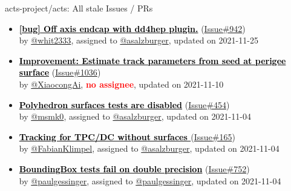 \begin{frame}[allowframebreaks]{ acts-project/acts: All stale Issues / PRs}
\begin{itemize}
    \item\iss\prstale
    \hspace*{0.1em}
    \textbf{\href{https://github.com/acts-project/acts/issues/942}{\textcolor{black}{[bug] Off axis endcap with dd4hep plugin.}}}
    (\href{https://github.com/acts-project/acts/issues/942}{Issue\#942}) \\
    by \href{https://github.com/whit2333}{@whit2333}, {}assigned to \href{https://github.com/asalzburger}{@asalzburger}, updated on 2021-11-25

    \item\iss\prstale
    \hspace*{0.1em}
    \textbf{\href{https://github.com/acts-project/acts/issues/1036}{\textcolor{black}{Improvement: Estimate track parameters from seed at perigee surface}}}
    (\href{https://github.com/acts-project/acts/issues/1036}{Issue\#1036}) \\
    by \href{https://github.com/XiaocongAi}{@XiaocongAi}, {}\textbf{\textcolor{Red}{no assignee}}, updated on 2021-11-10

    \item\iss\prstale
    \hspace*{0.1em}
    \textbf{\href{https://github.com/acts-project/acts/issues/454}{\textcolor{black}{Polyhedron surfaces tests are disabled}}}
    (\href{https://github.com/acts-project/acts/issues/454}{Issue\#454}) \\
    by \href{https://github.com/msmk0}{@msmk0}, {}assigned to \href{https://github.com/asalzburger}{@asalzburger}, updated on 2021-11-04

    \item\iss\prstale
    \hspace*{0.1em}
    \textbf{\href{https://github.com/acts-project/acts/issues/165}{\textcolor{black}{Tracking for TPC/DC without surfaces }}}
    (\href{https://github.com/acts-project/acts/issues/165}{Issue\#165}) \\
    by \href{https://github.com/FabianKlimpel}{@FabianKlimpel}, {}assigned to \href{https://github.com/asalzburger}{@asalzburger}, updated on 2021-11-04

    \item\iss\prstale
    \hspace*{0.1em}
    \textbf{\href{https://github.com/acts-project/acts/issues/752}{\textcolor{black}{BoundingBox tests fail on double precision}}}
    (\href{https://github.com/acts-project/acts/issues/752}{Issue\#752}) \\
    by \href{https://github.com/paulgessinger}{@paulgessinger}, {}assigned to \href{https://github.com/paulgessinger}{@paulgessinger}, updated on 2021-11-04


\end{itemize}
\end{frame}
